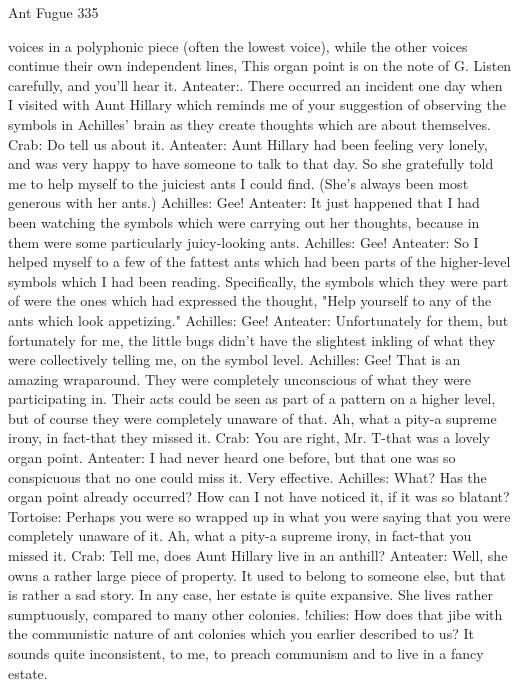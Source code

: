Ant Fugue                                                                                335

    voices in a polyphonic piece (often the lowest voice), while the other voices continue
    their own independent lines, This organ point is on the note of G. Listen carefully,
    and you'll hear it.
Anteater:. There occurred an incident one day when I visited with Aunt Hillary which
    reminds me of your suggestion of observing the symbols in Achilles' brain as they
    create thoughts which are about themselves.
Crab: Do tell us about it.
Anteater: Aunt Hillary had been feeling very lonely, and was very happy to have
    someone to talk to that day. So she gratefully told me to help myself to the juiciest
    ants I could find. (She's always been most generous with her ants.)
Achilles: Gee!
Anteater: It just happened that I had been watching the symbols which were carrying out
    her thoughts, because in them were some particularly juicy-looking ants.
Achilles: Gee!
Anteater: So I helped myself to a few of the fattest ants which had been parts of the
    higher-level symbols which I had been reading. Specifically, the symbols which they
    were part of were the ones which had expressed the thought, "Help yourself to any of
    the ants which look appetizing."
Achilles: Gee!
Anteater: Unfortunately for them, but fortunately for me, the little bugs didn't have the
    slightest inkling of what they were collectively telling me, on the symbol level.
Achilles: Gee! That is an amazing wraparound. They were completely unconscious of
    what they were participating in. Their acts could be seen as part of a pattern on a
    higher level, but of course they were completely unaware of that. Ah, what a pity-a
    supreme irony, in fact-that they missed it.
Crab: You are right, Mr. T-that was a lovely organ point.
Anteater: I had never heard one before, but that one was so conspicuous that no one could
    miss it. Very effective.
Achilles: What? Has the organ point already occurred? How can I not have noticed it, if it
    was so blatant?
Tortoise: Perhaps you were so wrapped up in what you were saying that you were
    completely unaware of it. Ah, what a pity-a supreme irony, in fact-that you missed it.
Crab: Tell me, does Aunt Hillary live in an anthill?
Anteater: Well, she owns a rather large piece of property. It used to belong to someone
    else, but that is rather a sad story. In any case, her estate is quite expansive. She lives
    rather sumptuously, compared to many other colonies.
!chilies: How does that jibe with the communistic nature of ant colonies which you
    earlier described to us? It sounds quite inconsistent, to me, to preach communism and
    to live in a fancy estate.




